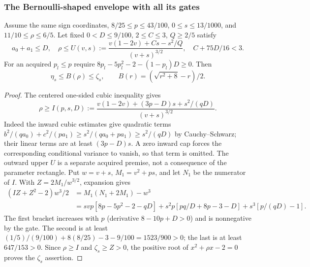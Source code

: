 \subsubsection{The Bernoulli-shaped envelope with all its gates}
\begin{proposition}\label{ms:finite:bernoulli-envelope}
Assume the same sign coordinates, $8/25\le p\le43/100$,
$0\le s\le13/1000$, and $11/10\le\rho\le6/5$. Let fixed
$0<D\le9/100$, $2\le C\le3$, $Q\ge2/5$ satisfy
\[
 a_0+a_1\le D,\quad
 \rho\le U(v,s):=\frac{v(1-2v)+Cs-s^2/Q}{(v+s)^{3/2}},
 \quad C+75D/16<3.
\]
For an acquired $p_l\le p$ require
$8p_l-5p_l^2-2-(1-p_l)D\ge0$. Then
\[
 \eta_s\le B(\rho)\le\zeta_s,\qquad
 B(r)=(\sqrt{r^2+8}-r)/2.
\]
\end{proposition}
\begin{proof}
The centered one-sided cubic inequality gives
\[
 \rho\ge I(p,s,D):=
 \frac{v(1-2v)+(3p-D)s+s^2/(qD)}{(v+s)^{3/2}}.
\]
Indeed the inward cubic estimates give quadratic terms
$b^2/(qa_0)+c^2/(pa_1)\ge s^2/(qa_0+pa_1)\ge s^2/(qD)$
by Cauchy--Schwarz; their linear terms are at least $(3p-D)s$.
A zero inward cap forces the corresponding conditional variance to vanish,
so that term is omitted. The outward upper $U$ is a separate acquired
premise, not a consequence of the parameter rectangle.
Put $w=v+s$, $M_1=v^2+ps$, and let $N_1$ be the numerator of $I$.
With $Z=2M_1/w^{3/2}$, expansion gives
\begin{align*}
 (IZ+Z^2-2)w^3/2
 &=M_1(N_1+2M_1)-w^3\\
 &=svp[8p-5p^2-2-qD]+s^2p[pq/D+8p-3-D]
   +s^3[p/(qD)-1].
\end{align*}
The first bracket increases with $p$ (derivative $8-10p+D>0$) and
is nonnegative by the gate. The second is at least
$(1/5)/(9/100)+8(8/25)-3-9/100=1523/900>0$; the last is at least
$647/153>0$. Since $\rho\ge I$ and $\zeta_s\ge Z>0$, the positive
root of $x^2+\rho x-2=0$ proves the $\zeta_s$ assertion.


\end{proof}
